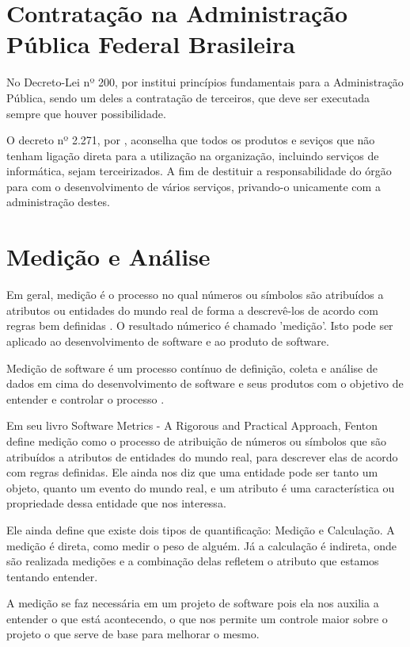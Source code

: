 \section{Contratação na Administração Pública Federal Brasileira}

No Decreto-Lei nº 200, \cite{decreto200} por institui princípios fundamentais para a
Administração Pública, sendo um deles a contratação de terceiros, que deve ser
executada sempre que houver possibilidade.

O decreto nº 2.271, por \cite{decreto2271}, aconselha que todos os produtos e seviços
que não tenham ligação direta para a utilização na organização, incluindo serviços
de informática, sejam terceirizados. A fim de destituir a responsabilidade do
órgão para com o desenvolvimento de vários serviços, privando-o unicamente com
a administração destes.

\section{Medição e Análise}
Em geral, medição é o processo no qual números ou símbolos são atribuídos a
atributos ou entidades do mundo real de forma a descrevê-los de acordo com regras
bem definidas \cite{fentonpfleeger}. O resultado númerico é chamado 'medição'.
Isto pode ser aplicado ao desenvolvimento de software e ao produto de software.

Medição de software é um processo contínuo de definição, coleta e análise de
dados em cima do desenvolvimento de software e seus produtos com o objetivo de
entender e controlar o processo \cite{egon}.


Em seu livro Software Metrics - A Rigorous and Practical Approach, Fenton define
medição como o processo de atribuição de números ou símbolos que são atribuídos
a atributos de entidades do mundo real, para descrever elas de acordo com regras
definidas. Ele ainda nos diz que uma entidade pode ser tanto um objeto, quanto
um evento do mundo real, e um atributo é uma característica ou propriedade dessa
entidade que nos interessa.

Ele ainda define que existe dois tipos de quantificação: Medição e Calculação.
A medição é direta, como medir o peso de alguém. Já a calculação é indireta, onde
são realizada medições e a combinação delas refletem o atributo que estamos
tentando entender.

A medição se faz necessária em um projeto de software pois ela nos auxilia a
entender o que está acontecendo, o que nos permite um controle maior sobre o
projeto o que serve de base para melhorar o mesmo.


